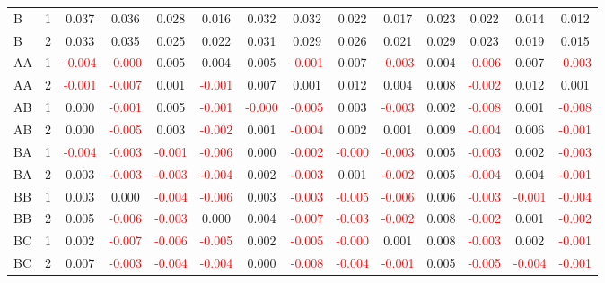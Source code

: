 \begin{table}[!htb]
{\begin{tabular}{llcccccccccccc}
B & 1 & 0.037 & 0.036 & 0.028 & 0.016 & 0.032 & 0.032 & 0.022 & 0.017 & 0.023 & 0.022 & 0.014 & 0.012\\
B & 2 & 0.033 & 0.035 & 0.025 & 0.022 & 0.031 & 0.029 & 0.026 & 0.021 & 0.029 & 0.023 & 0.019 & 0.015\\
AA & 1 & \textcolor{red}{-0.004} & \textcolor{red}{-0.000} & 0.005 & 0.004 & 0.005 & \textcolor{red}{-0.001} & 0.007 & \textcolor{red}{-0.003} & 0.004 & \textcolor{red}{-0.006} & 0.007 & \textcolor{red}{-0.003}\\
AA & 2 & \textcolor{red}{-0.001} & \textcolor{red}{-0.007} & 0.001 & \textcolor{red}{-0.001} & 0.007 & 0.001 & 0.012 & 0.004 & 0.008 & \textcolor{red}{-0.002} & 0.012 & 0.001\\
AB & 1 & 0.000 & \textcolor{red}{-0.001} & 0.005 & \textcolor{red}{-0.001} & \textcolor{red}{-0.000} & \textcolor{red}{-0.005} & 0.003 & \textcolor{red}{-0.003} & 0.002 & \textcolor{red}{-0.008} & 0.001 & \textcolor{red}{-0.008}\\
AB & 2 & 0.000 & \textcolor{red}{-0.005} & 0.003 & \textcolor{red}{-0.002} & 0.001 & \textcolor{red}{-0.004} & 0.002 & 0.001 & 0.009 & \textcolor{red}{-0.004} & 0.006 & \textcolor{red}{-0.001}\\
BA & 1 & \textcolor{red}{-0.004} & \textcolor{red}{-0.003} & \textcolor{red}{-0.001} & \textcolor{red}{-0.006} & 0.000 & \textcolor{red}{-0.002} & \textcolor{red}{-0.000} & \textcolor{red}{-0.003} & 0.005 & \textcolor{red}{-0.003} & 0.002 & \textcolor{red}{-0.003}\\
BA & 2 & 0.003 & \textcolor{red}{-0.003} & \textcolor{red}{-0.003} & \textcolor{red}{-0.004} & 0.002 & \textcolor{red}{-0.003} & 0.001 & \textcolor{red}{-0.002} & 0.005 & \textcolor{red}{-0.004} & 0.004 & \textcolor{red}{-0.001}\\
BB & 1 & 0.003 & 0.000 & \textcolor{red}{-0.004} & \textcolor{red}{-0.006} & 0.003 & \textcolor{red}{-0.003} & \textcolor{red}{-0.005} & \textcolor{red}{-0.006} & 0.006 & \textcolor{red}{-0.003} & \textcolor{red}{-0.001} & \textcolor{red}{-0.004}\\
BB & 2 & 0.005 & \textcolor{red}{-0.006} & \textcolor{red}{-0.003} & 0.000 & 0.004 & \textcolor{red}{-0.007} & \textcolor{red}{-0.003} & \textcolor{red}{-0.002} & 0.008 & \textcolor{red}{-0.002} & 0.001 & \textcolor{red}{-0.002}\\
BC & 1 & 0.002 & \textcolor{red}{-0.007} & \textcolor{red}{-0.006} & \textcolor{red}{-0.005} & 0.002 & \textcolor{red}{-0.005} & \textcolor{red}{-0.000} & 0.001 & 0.008 & \textcolor{red}{-0.003} & 0.002 & \textcolor{red}{-0.001}\\
BC & 2 & 0.007 & \textcolor{red}{-0.003} & \textcolor{red}{-0.004} & \textcolor{red}{-0.004} & 0.000 & \textcolor{red}{-0.008} & \textcolor{red}{-0.004} & \textcolor{red}{-0.001} & 0.005 & \textcolor{red}{-0.005} & \textcolor{red}{-0.004} & \textcolor{red}{-0.001}\\
\hline
    \end{tabular}%
    }
\end{table}

